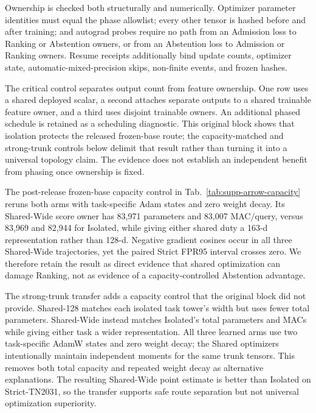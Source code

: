 Ownership is checked both structurally and numerically.  Optimizer parameter
identities must equal the phase allowlist; every other tensor is hashed before
and after training; and autograd probes require no path from an Admission loss
to Ranking or Abstention owners, or from an Abstention loss to Admission or
Ranking owners.  Resume receipts additionally bind update counts, optimizer
state, automatic-mixed-precision skips, non-finite events, and frozen hashes.

The critical control separates output count from feature ownership.  One row
uses a shared deployed scalar, a second attaches separate outputs to a shared
trainable feature owner, and a third uses disjoint trainable owners.  An
additional phased schedule is retained as a scheduling diagnostic.  This
original block shows that isolation protects the released frozen-base route;
the capacity-matched and strong-trunk controls below delimit that result rather
than turning it into a universal topology claim.  The evidence does not
establish an independent benefit from phasing once ownership is fixed.

The post-release frozen-base capacity control in
Tab.~\ref{tab:supp-arrow-capacity} reruns both arms with task-specific Adam
states and zero weight decay.  Its Shared-Wide score owner has 83,971
parameters and 83,007 MAC/query, versus 83,969 and 82,944 for Isolated, while
giving either shared duty a 163-d representation rather than 128-d.  Negative
gradient cosines occur in all three Shared-Wide trajectories, yet the paired
Strict FPR95 interval crosses zero.  We therefore retain the result as direct
evidence that shared optimization can damage Ranking, not as evidence of a
capacity-controlled Abstention advantage.



The strong-trunk transfer adds a capacity control that the original block did
not provide.  Shared-128 matches each isolated task tower's width but uses
fewer total parameters.  Shared-Wide instead matches Isolated's total
parameters and MACs while giving either task a wider representation.  All
three learned arms use two task-specific AdamW states and zero weight decay;
the Shared optimizers intentionally maintain independent moments for the same
trunk tensors.  This removes both total capacity and repeated weight decay as
alternative explanations.  The resulting Shared-Wide point estimate is better
than Isolated on Strict-TN2031, so the transfer supports safe route separation
but not universal optimization superiority.

